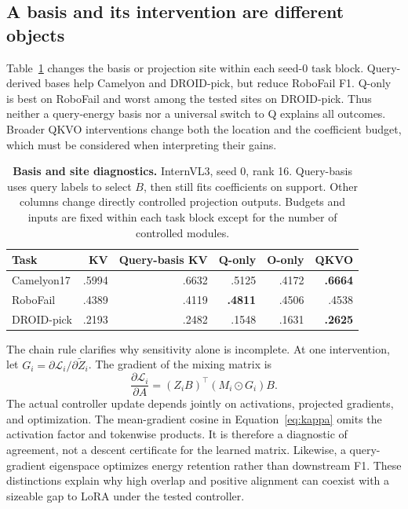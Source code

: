 \documentclass{article}
\begin{document}
\subsection{A basis and its intervention are different objects}
Table~\ref{tab:oracles} changes the basis or projection site within each seed-0 task block. Query-derived bases help Camelyon and DROID-pick, but reduce RoboFail F1. Q-only is best on RoboFail and worst among the tested sites on DROID-pick. Thus neither a query-energy basis nor a universal switch to Q explains all outcomes. Broader QKVO interventions change both the location and the coefficient budget, which must be considered when interpreting their gains.

\begin{table}[t]
\caption{\textbf{Basis and site diagnostics.} InternVL3, seed 0, rank 16. Query-basis uses query labels to select $B$, then still fits coefficients on support. Other columns change directly controlled projection outputs. Budgets and inputs are fixed within each task block except for the number of controlled modules.}
\label{tab:oracles}
\centering\small
\begin{tabular}{@{}lrrrrr@{}}
\toprule
Task & KV & Query-basis KV & Q-only & O-only & QKVO\\
\midrule
Camelyon17 & .5994 & .6632 & .5125 & .4172 & \textbf{.6664}\\
RoboFail & .4389 & .4119 & \textbf{.4811} & .4506 & .4538\\
DROID-pick & .2193 & .2482 & .1548 & .1631 & \textbf{.2625}\\
\bottomrule
\end{tabular}
\end{table}

The chain rule clarifies why sensitivity alone is incomplete. At one intervention, let $G_i=\partial\mathcal L_i/\partial\widetilde Z_i$. The gradient of the mixing matrix is
\begin{equation}
 \frac{\partial\mathcal L_i}{\partial A}
 =(Z_iB)^\top(M_i\odot G_i)B.
 \label{eq:controllergrad}
\end{equation}
The actual controller update depends jointly on activations, projected gradients, and optimization. The mean-gradient cosine in Equation~\ref{eq:kappa} omits the activation factor and tokenwise products. It is therefore a diagnostic of agreement, not a descent certificate for the learned matrix. Likewise, a query-gradient eigenspace optimizes energy retention rather than downstream F1. These distinctions explain why high overlap and positive alignment can coexist with a sizeable gap to LoRA under the tested controller.
\end{document}
